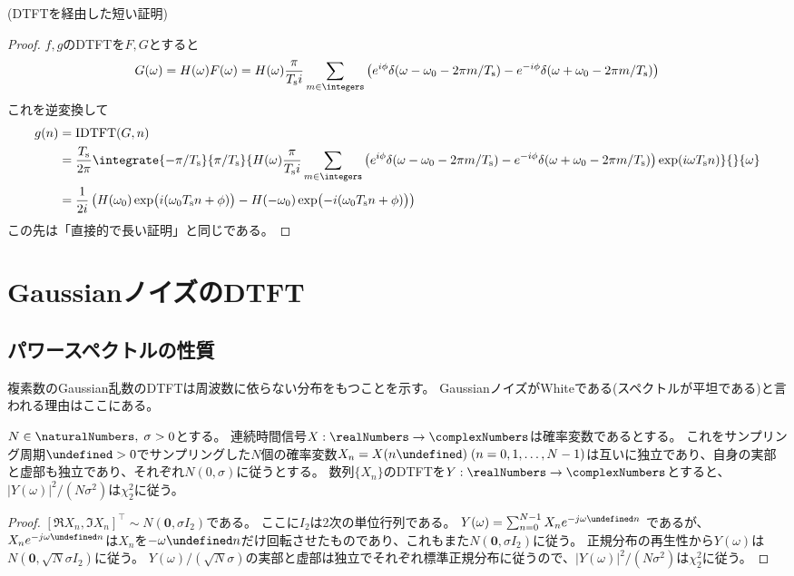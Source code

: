         (DTFTを経由した短い証明)
        \begin{proof}
            \quad\par
            $f,g$のDTFTを$F,G$とすると
            \[ G(\omega) = H(\omega)F(\omega) = H(\omega)\frac{\pi}{\Ts i}\sum_{m\in\integers}\left(e^{i\phi}\delta(\omega-\omega_0 - 2\pi m/\Ts) - e^{-i\phi}\delta(\omega+\omega_0 - 2\pi m/\Ts)\right) \]
            これを逆変換して
            \begin{align*}
                g(n) &= \text{IDTFT}(G,n) \\
                &= \frac{\Ts}{2\pi}\integrate{-\pi/\Ts}{\pi/\Ts}{H(\omega)\frac{\pi}{\Ts i}\sum_{m\in\integers}\left(e^{i\phi}\delta(\omega-\omega_0 - 2\pi m/\Ts) - e^{-i\phi}\delta(\omega+\omega_0 - 2\pi m/\Ts)\right)\exp(i\omega\Ts n)}{}{\omega} \\
                &= \frac{1}{2i}\left(H(\omega_0)\exp\bigl(i(\omega_0\Ts n+\phi)\bigr) - H(-\omega_0)\exp\bigl(-i(\omega_0\Ts n+\phi)\bigr)\right)
            \end{align*}
            この先は「直接的で長い証明」と同じである。
        \end{proof}
        \let\Ts\undefined
    \section{GaussianノイズのDTFT}
        \newcommand{\Ts}{\Tsamp}
        \subsection{パワースペクトルの性質}
            \label{GaussianノイズのDTFTのパワースペクトル}
            複素数のGaussian乱数のDTFTは周波数に依らない分布をもつことを示す。
            GaussianノイズがWhiteである(スペクトルが平坦である)と言われる理由はここにある。
            \begin{shadebox}
                $N\in\naturalNumbers,\;\sigma>0$とする。
                連続時間信号$X:\realNumbers\to\complexNumbers$は確率変数であるとする。
                これをサンプリング周期$\Ts>0$でサンプリングした$N$個の確率変数$X_n = X(n\Ts)\;(n=0,1,\dots,N-1)$は互いに独立であり、自身の実部と虚部も独立であり、それぞれ$N(0,\sigma)$に従うとする。
                数列$\{X_n\}$のDTFTを$Y:\realNumbers\to\complexNumbers$とすると、$|Y(\omega)|^2/(N\sigma^2)$は$\chi_2^2$に従う。
            \end{shadebox}
            \begin{proof}
                \quad\par
                $[\Re{X_n}, \Im{X_n}]^\top \sim N(\bm{0}, \sigma I_2)$である。
                ここに$I_2$は2次の単位行列である。
                $Y(\omega) = \sum_{n=0}^{N-1} X_n e^{-j\omega\Ts n}$
                であるが、$X_n e^{-j\omega\Ts n}$は$X_n$を$-\omega\Ts n$だけ回転させたものであり、これもまた$N(\bm{0}, \sigma I_2)$に従う。
                正規分布の再生性から$Y(\omega)$は$N(\bm{0}, \sqrt{N}\sigma I_2)$に従う。
                $Y(\omega)/(\sqrt{N}\sigma)$の実部と虚部は独立でそれぞれ標準正規分布に従うので、$|Y(\omega)|^2/(N\sigma^2)$は$\chi_2^2$に従う。
            \end{proof}
